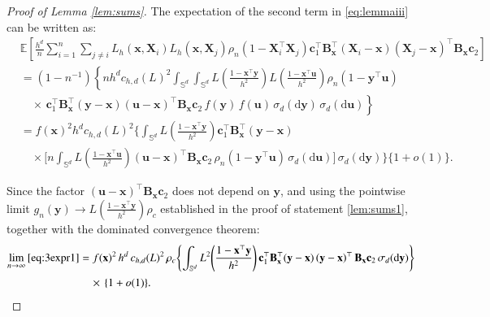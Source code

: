 \documentclass[12pt]{report} %
\newcommand{\bX}{\mathbf{X}}
\newcommand{\bx}{\mathbf{x}}
\newcommand{\by}{\mathbf{y}}
\newcommand{\bc}{\mathbf{c}}
\newcommand{\bu}{\boldsymbol{u}}
\newcommand{\sigmad}{\sigma_{d}}
\newcommand{\rd}{\mathrm{d}}
\newcommand{\Sd}{\mathbb{S}^{d}}
\newcommand{\bB}{\mathbf{B}}
\begin{document}
\begin{proof}[Proof of Lemma \ref{lem:sums}]
The expectation of the second term in \eqref{eq:lemmaiii} can be written as:
\begin{align}
&\mathbb{E}\!\left[
\frac{h^d}{n} \sum_{i=1}^n\sum_{j\neq i} 
L_h\left(\bx, \bX_i\right)L_h\left(\bx, \bX_j\right)
\rho_n\left(1-\bX_i^\top\bX_j\right)
\bc_1^\top\bB_{\bx}^\top\left(\bX_i -\bx\right)\left(\bX_j-\bx\right)^\top\bB_{\bx}\bc_2
\right] \nonumber \\
&= (1 - n^{-1}) \left\{
    n h^d c_{h,d}(L)^2
    \int_{\Sd} \int_{\Sd}
    L\!\left(\frac{1 - \bx^\top \by}{h^2}\right)
    L\!\left(\frac{1 - \bx^\top \bu}{h^2}\right)
    \rho_n\left(1 - \by^\top \bu\right) \right. \nonumber \\
&\left. \quad \times
    \, \bc_1^\top\bB_{\bx}^\top\left(\by -\bx\right)\left(\bu-\bx\right)^\top\bB_{\bx}\bc_2\,
    f(\by)\, f(\bu)
    \,\sigmad(\rd\by)
    \,\sigmad(\rd\bu)
\right\} \nonumber\\
&= f(\bx)^2 h^d c_{h,d}(L)^2
\Biggl\{
\int_{\Sd}
L\!\left(\frac{1-\bx^\top\by}{h^2}\right)
\bc_1^\top\bB_{\bx}^\top(\by-\bx)
\nonumber\\
&\quad\times
\Biggl[
n \int_{\Sd}
L\!\left(\frac{1-\bx^\top\bu}{h^2}\right)
\left(\bu-\bx\right)^\top\bB_{\bx}\bc_2\,
\rho_n(1-\by^\top\bu)
\,\sigmad(\rd\bu)
\Biggr]
\,\sigmad(\rd\by)
\Biggr\}
\{1+o(1)\}.
\label{eq:3expr1}
\end{align}

Since the factor $(\bu-\bx)^\top\bB_{\bx}\bc_2$ does not depend on $\by$, and using the pointwise limit $g_n(\by) \to L\!\left(\frac{1-\bx^\top\by}{h^2}\right)\rho_c$ established in the proof of statement \ref{lem:sums1}, together with the dominated convergence theorem:
\begin{align}
\lim_{n\to\infty}\eqref{eq:3expr1}
&= f(\bx)^2\, h^d\, c_{h,d}(L)^2\,\rho_c
\Biggl\{
\int_{\Sd}
L^2\!\left(\frac{1-\bx^\top\by}{h^2}\right)
\bc_1^\top\bB_{\bx}^\top(\by-\bx)\left(\by-\bx\right)^\top\bB_{\bx}\bc_2
\,\sigmad(\rd\by)
\Biggr\} \nonumber \\
&\quad \times \, \{1+o(1)\}.
\label{eq:3expr2}
\end{align}


\end{proof}
\end{document}
